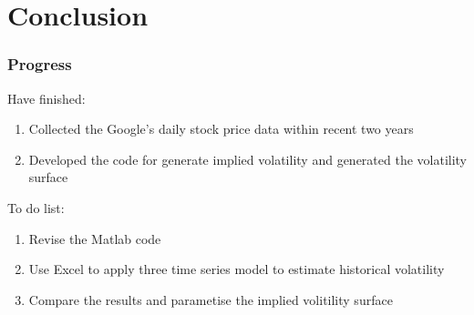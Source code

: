 \documentclass[compress,handout,10pt]{beamer}
\let\olditem\item
\renewcommand{\item}{\setlength{\itemsep}{0.5\baselineskip}\olditem}
\begin{document}
\section{Conclusion}
\begin{frame}
    \frametitle{Progress}
Have finished:
\begin{enumerate}
        \item Collected the Google's daily stock price data within recent two years
        \item Developed the code for generate implied volatility and generated the volatility surface
         \end{enumerate}
To do list: 
\begin{enumerate}
        \item Revise the Matlab code 
        \item Use Excel to apply three time series model to estimate historical volatility
        \item Compare the results and parametise the implied volitility surface
         \end{enumerate}
\end{frame}

\begin {frame}

\nocite{*}

\end {frame}
\end{document}
